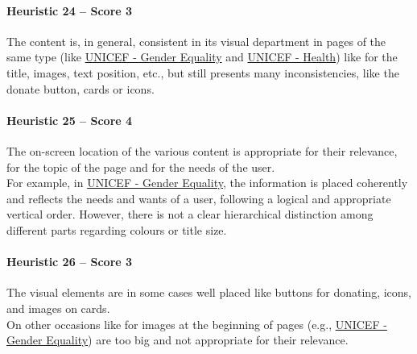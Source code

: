\paragraph*{Heuristic 24 – Score 3}
The content is, in general, consistent in its visual department in pages of the same type (like \href{https://www.unicef.org/gender-equality}{UNICEF - Gender Equality} and \href{https://www.unicef.org/health}{UNICEF - Health}) like for the title, images, text position, etc., but still presents many inconsistencies, like the donate button, cards or icons.

\paragraph*{Heuristic 25 – Score 4}
The on-screen location of the various content is appropriate for their relevance, for the topic of the page and for the needs of the user.\\
For example, in \href{https://www.unicef.org/gender-equality}{UNICEF - Gender Equality}, the information is placed coherently and reflects the needs and wants of a user, following a logical and appropriate vertical order. However, there is not a clear hierarchical distinction among different parts regarding colours or title size.

\paragraph*{Heuristic 26 – Score 3}
The visual elements are in some cases well placed like buttons for donating, icons, and images on cards.\\
On other occasions like for images at the beginning of pages (e.g., \href{https://www.unicef.org/gender-equality}{UNICEF - Gender Equality}) are too big and not appropriate for their relevance.

